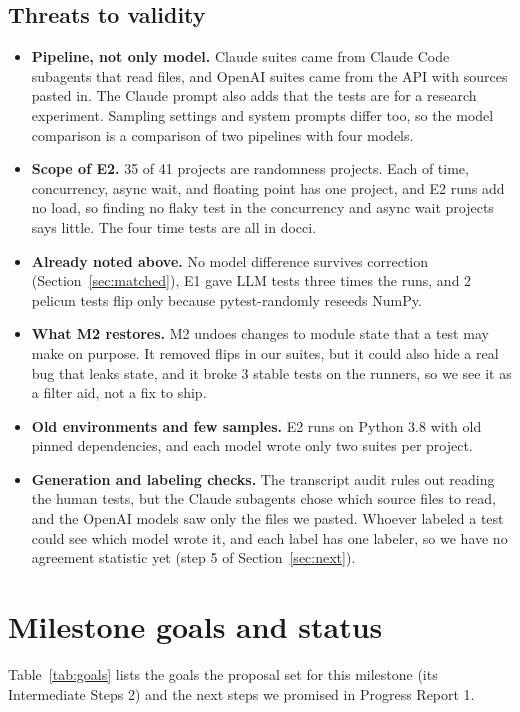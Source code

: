 \documentclass[sigconf,nonacm]{acmart}
\begin{document}
\subsection{Threats to validity}
\label{sec:threats}
\begin{itemize}
\item \textbf{Pipeline, not only model.} Claude suites came from Claude Code subagents that read files, and OpenAI suites came from the API with sources pasted in. The Claude prompt also adds that the tests are for a research experiment. Sampling settings and system prompts differ too, so the model comparison is a comparison of two pipelines with four models.
\item \textbf{Scope of E2.} 35 of 41 projects are randomness projects. Each of time, concurrency, async wait, and floating point has one project, and E2 runs add no load, so finding no flaky test in the concurrency and async wait projects says little. The four time tests are all in docci.
\item \textbf{Already noted above.} No model difference survives correction (Section~\ref{sec:matched}), E1 gave LLM tests three times the runs, and 2 pelicun tests flip only because pytest-randomly reseeds NumPy.
\item \textbf{What M2 restores.} M2 undoes changes to module state that a test may make on purpose. It removed flips in our suites, but it could also hide a real bug that leaks state, and it broke 3 stable tests on the runners, so we see it as a filter aid, not a fix to ship.
\item \textbf{Old environments and few samples.} E2 runs on Python 3.8 with old pinned dependencies, and each model wrote only two suites per project.
\item \textbf{Generation and labeling checks.} The transcript audit rules out reading the human tests, but the Claude subagents chose which source files to read, and the OpenAI models saw only the files we pasted. Whoever labeled a test could see which model wrote it, and each label has one labeler, so we have no agreement statistic yet (step 5 of Section~\ref{sec:next}).
\end{itemize}

\section{Milestone goals and status}
Table~\ref{tab:goals} lists the goals the proposal set for this milestone (its Intermediate Steps 2) and the next steps we promised in Progress Report 1.
\end{document}
